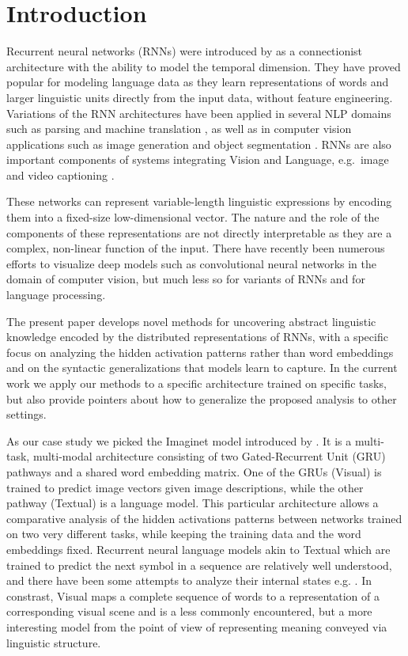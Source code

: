 \section{Introduction}
\label{sec:intro}
Recurrent neural networks (RNNs) were introduced by
as a connectionist architecture with the
ability to model the temporal dimension. They have proved popular for
modeling language data as they learn representations of words and
larger linguistic units directly from the input data, without feature
engineering. Variations of the RNN architectures have been applied in
several NLP domains such as parsing \cite{vinyals2015grammar} and
machine translation \cite{bahdanau2014neural}, as well as in computer
vision applications such as image generation \cite{gregor2015draw} and
object segmentation \cite{visin2015reseg}. RNNs are also important
components of systems integrating Vision and Language, e.g.\ image
\cite{karpathy2015deep} and video captioning \cite{yu2015video}.

These networks can represent variable-length linguistic expressions by
encoding them into a fixed-size low-dimensional vector. The nature and
the role of the components of these representations are not directly
interpretable as they are a complex, non-linear function of the
input. There have recently been numerous efforts to visualize deep
models such as convolutional neural networks in the domain of computer
vision, but much less so for variants of RNNs and for language
processing.
 
The present paper develops novel methods for uncovering abstract
linguistic knowledge encoded by the distributed representations of RNNs,
with a specific focus on analyzing the hidden activation patterns rather 
than word embeddings and on the syntactic generalizations 
that models learn to capture. In the current work we apply our methods
to a specific architecture trained on specific tasks, but also provide
pointers about how to generalize the proposed analysis to other settings.\label{generalintro}

As our case study we picked the {\sc Imaginet} model introduced by \label{explainimaginet}
. It is a multi-task, multi-modal
architecture consisting of two Gated-Recurrent Unit (GRU)
\cite{cho2014properties,chung2014empirical} pathways and
a shared word embedding matrix. One of the GRUs ({\sc Visual}) is
trained to predict image vectors given image descriptions, while the other
pathway ({\sc Textual}) is a language model. This particular
architecture allows a comparative analysis of the hidden activations
patterns between networks trained on two very different tasks, while
keeping the training data and the word embeddings fixed. Recurrent neural
language models akin to {\sc Textual} which are trained to predict the
next symbol in a sequence are relatively well understood, and there
have been some attempts to analyze their internal states e.g.
\cite{elman1991distributed,karpathy2015visualizing}. In
constrast, {\sc Visual} maps a complete sequence of words to
a representation of a corresponding visual scene and is a less
commonly encountered, but a more interesting model from the point of
view of representing meaning conveyed via linguistic structure.


